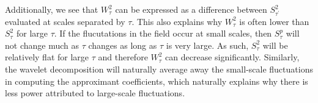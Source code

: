 \documentclass{article}
\begin{document}
Additionally, we see that $W^2_\tau$ can be expressed as a difference between $S^2_{\tau^\prime}$ evaluated at scales separated by $\tau$.
This also explains why $W^2_\tau$ is often lower than $S^2_\tau$ for large $\tau$.
If the flucutations in the field occur at small scales, then $S^p_\tau$ will not change much as $\tau$ changes as long as $\tau$ is very large.
As such, $S^2_\tau$ will be relatively flat for large $\tau$ and therefore $W^2_\tau$ can decrease significantly.
Similarly, the wavelet decomposition will naturally average away the small-scale fluctuations in computing the approximant coefficients, which naturally explains why there is less power attributed to large-scale fluctuations.

\end{document}
